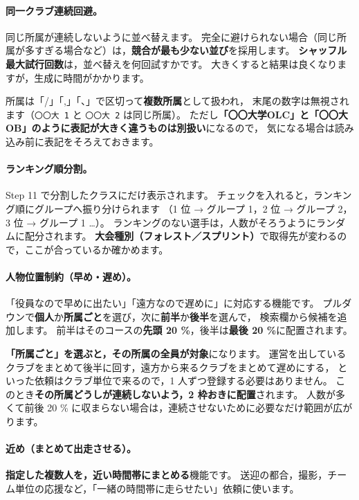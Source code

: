 \begin{J2M}

\paragraph{同一クラブ連続回避。}
同じ所属が連続しないように並べ替えます。
完全に避けられない場合（同じ所属が多すぎる場合など）は，\textbf{競合が最も少ない並び}を採用します。
\textbf{シャッフル最大試行回数}は，並べ替えを何回試すかです。
大きくすると結果は良くなりますが，生成に時間がかかります。

所属は「/」「,」「、」で区切って\textbf{複数所属}として扱われ，
末尾の数字は無視されます（\texttt{〇〇大 1} と \texttt{〇〇大 2} は同じ所属）。
ただし\textbf{「〇〇大学OLC」と「〇〇大 OB」のように表記が大きく違うものは別扱い}になるので，
気になる場合は読み込み前に表記をそろえておきます。

\paragraph{ランキング順分割。\tRANK}
Step 11 で分割したクラスにだけ表示されます。
チェックを入れると，ランキング順にグループへ振り分けられます
（1 位 → グループ 1，2 位 → グループ 2，3 位 → グループ 1 …）。
ランキングのない選手は，人数がそろうようにランダムに配分されます。
\textbf{大会種別（フォレスト／スプリント）}で取得先が変わるので，ここが合っているか確かめます。

\paragraph{人物位置制約（早め・遅め）。}
「役員なので早めに出たい」「遠方なので遅めに」に対応する機能です。
プルダウンで\textbf{個人}か\textbf{所属ごと}を選び，次に\textbf{前半}か\textbf{後半}を選んで，
検索欄から候補を追加します。
前半はそのコースの\textbf{先頭 20 \%}，後半は\textbf{最後 20 \%}に配置されます。

\textbf{「所属ごと」を選ぶと，その所属の全員が対象}になります。
運営を出しているクラブをまとめて後半に回す，遠方から来るクラブをまとめて遅めにする，
といった依頼はクラブ単位で来るので，1 人ずつ登録する必要はありません。
このとき\textbf{その所属どうしが連続しないよう，2 枠おきに配置}されます。
人数が多くて前後 20 \% に収まらない場合は，連続させないために必要なだけ範囲が広がります。

\paragraph{近め（まとめて出走させる）。}
\textbf{指定した複数人を，近い時間帯にまとめる}機能です。
送迎の都合，撮影，チーム単位の応援など，「一緒の時間帯に走らせたい」依頼に使います。


\end{J2M}
